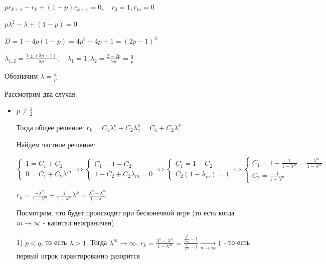 \documentclass[12pt]{article}
\begin{document}
    $pr_{k + 1} - r_k + (1 - p) r_{k - 1} = 0, \quad r_0 = 1, r_{m} = 0$

    $p\lambda^2 - \lambda + (1 - p) = 0$

    $D = 1 - 4p(1 - p) = 4p^2 - 4p + 1 = (2p - 1)^2$

    $\lambda_{1, 2} = \frac{1 \pm (2p - 1)}{2p}; \quad \lambda_1 = 1; \lambda_2 = \frac{2 - 2p}{2p} = \frac{q}{p}$

    Обозначим $\lambda = \frac{q}{p}$

    Рассмотрим два случая: 

    \begin{itemize}
        \item $p \neq \frac{1}{2}$

        Тогда общее решение: $r_k = C_1 \lambda_1^k + C_2 \lambda_2^k = C_1 + C_2 \lambda^k$

        Найдем частное решение:

        $\begin{cases}
            1 = C_1 + C_2 \\
            0 = C_1 + C_2 \lambda^m
        \end{cases} \Longleftrightarrow \begin{cases}
            C_1 = 1 - C_2 \\
            1 - C_2 + C_2 \lambda_m = 0
        \end{cases} \Longleftrightarrow \begin{cases}
            C_1 = 1 - C_2 \\
            C_2 (1 - \lambda_m) = 1
        \end{cases} \Longleftrightarrow \begin{cases}
            C_1 = 1 - \frac{1}{1 - \lambda^m} = \frac{-\lambda^m}{1 - \lambda^m} \\
            C_2 = \frac{1}{1 - \lambda^m}
        \end{cases}$

        $r_k = \frac{-\lambda^m}{1 - \lambda^m} + \frac{1}{1 - \lambda^m} \lambda^k = \frac{\lambda^k - \lambda^m}{1 - \lambda^m}$

        Посмотрим, что будет происходит при бесконечной игре (то есть когда $m \to \infty$ - капитал неограничен)

        1) $p < q$, то есть $\lambda > 1$. Тогда $\lambda^m \to \infty$, $r_k = \frac{\lambda^k - \lambda^m}{1 - \lambda^m} = \frac{\frac{\lambda^k}{\lambda_m} - 1}{\frac{1}{\lambda^m} - 1} \underset{n \to \infty}{\longrightarrow} 1$ - 
        то есть первый игрок гарантированно разорится


\end{itemize}
\end{document}
